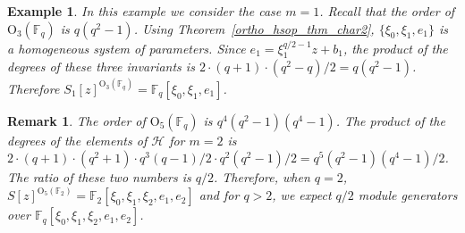 \documentclass{amsart}
\newtheorem{remark}[subsection]{Remark}
\newtheorem{example}[subsection]{Example}
\newcommand{\field}{\mathbb{F}}
\newcommand{\orth}[2]{{{\text{O}_{{#1}}(\field_{#2})}}}
\newcommand{\h}{\mathcal{H}}
\begin{document}
\begin{example} In this example we consider the case $m=1$. Recall that the order of $\orth{3}{q}$ is $q(q^2-1)$.
Using Theorem~\ref{ortho_hsop_thm_char2}, $\{\xi_0,\xi_1,e_1\}$ is a homogeneous system of parameters.
Since $e_1=\xi_1^{q/2-1}z+b_1$, the product of the degrees of these three invariants is $2\cdot (q+1)\cdot(q^2-q)/2=q(q^2-1)$. Therefore 
$S_1[z]^{\orth{3}{q}}=\field_q[\xi_0,\xi_1,e_1]$. 
\end{example}

\begin{remark} The order of $\orth{5}{q}$ is $q^4(q^2-1)(q^4-1)$. 
The product of the degrees of the elements of $\h$ for $m=2$ is
$2\cdot (q+1)\cdot (q^2+1) \cdot q^3(q-1)/2\cdot q^2(q^2-1)/2=q^5(q^2-1)(q^4-1)/2$. The ratio of these two numbers is $q/2$.
Therefore, when $q=2$, $S[z]^{\orth{5}{2}}=\field_2[\xi_0,\xi_1,\xi_2,e_1,e_2]$ and for $q>2$, we expect $q/2$ module generators over 
$\field_q[\xi_0,\xi_1,\xi_2,e_1,e_2]$.
\end{remark}
\end{document}
